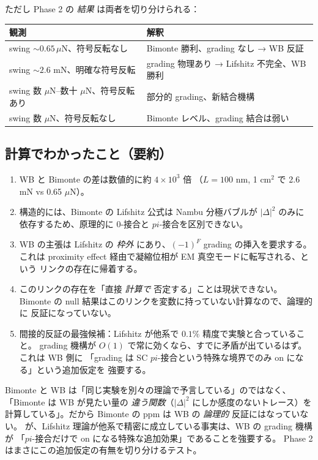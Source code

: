 \documentclass[11pt,a4paper]{article}
\def\pi{pi}%
\def\textbf#1{#1}%
\begin{document}
ただし \textbf{Phase 2 の \emph{結果} は両者を切り分けられる}：

\begin{center}
\begin{tabular}{ll}
\toprule
観測 & 解釈 \\
\midrule
swing $\sim 0.65\,\mu$N、符号反転なし & Bimonte 勝利、grading なし → \textbf{WB 反証} \\
swing $\sim 2.6$ mN、明確な符号反転 & grading 物理あり → \textbf{Lifshitz 不完全、WB 勝利} \\
swing 数 $\mu$N--数十 $\mu$N、符号反転あり & 部分的 grading、新結合機構 \\
swing 数 $\mu$N、符号反転なし & Bimonte レベル、grading 結合は弱い \\
\bottomrule
\end{tabular}
\end{center}

\subsection{計算でわかったこと（要約）}

\begin{enumerate}
\item WB と Bimonte の差は数値的に約 $4\times 10^3$ 倍
  （$L=100$ nm, 1 cm$^2$ で 2.6 mN vs 0.65 $\mu$N）。
\item 構造的には、Bimonte の Lifshitz 公式は Nambu 分極バブルが $|\Delta|^2$ のみに
  依存するため、原理的に 0-接合と $\pi$-接合を区別できない。
\item WB の主張は Lifshitz の \emph{枠外} にあり、$(-1)^F$ grading の挿入を要求する。
  これは proximity effect 経由で凝縮位相が EM 真空モードに転写される、という
  リンクの存在に帰着する。
\item このリンクの存在を「直接 \emph{計算で} 否定する」ことは現状できない。
  Bimonte の null 結果はこのリンクを変数に持っていない計算なので、論理的に
  反証になっていない。
\item 間接的反証の最強候補：Lifshitz が他系で $0.1\%$ 精度で実験と合っていること。
  grading 機構が $O(1)$ で常に効くなら、すでに矛盾が出ているはず。これは WB 側に
  「grading は SC $\pi$-接合という特殊な境界でのみ on になる」という追加仮定を
  強要する。
\end{enumerate}

\begin{tcolorbox}[colback=green!5,colframe=green!50!black,title=一行まとめ]
Bimonte と WB は「同じ実験を別々の理論で予言している」のではなく、
「Bimonte は WB が見たい量の \emph{違う関数}（$|\Delta|^2$ にしか感度のないトレース）を
計算している」。だから Bimonte の ppm は WB の \emph{論理的} 反証にはなっていない。
が、Lifshitz 理論が他系で精密に成立している事実は、WB の grading 機構が
「$\pi$-接合だけで on になる特殊な追加効果」であることを強要する。
Phase 2 はまさにこの追加仮定の有無を切り分けるテスト。
\end{tcolorbox}
\end{document}
